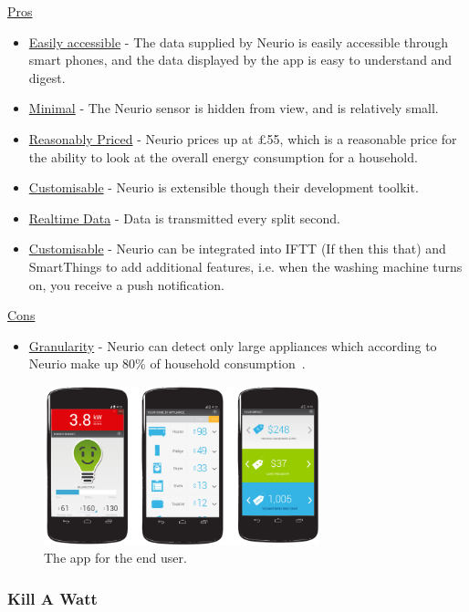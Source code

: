 \documentclass[preprint,12pt,3p]{elsarticle}
\begin{document}
\begin{center}
\underline{Pros}
\begin{itemize}
        \item \underline{Easily accessible} - The data supplied by Neurio is easily accessible through smart phones, and the data displayed by the app is easy to understand and digest.
    \item \underline{Minimal} - The Neurio sensor is hidden from view, and is relatively small.
    \item \underline{Reasonably Priced} - Neurio prices up at \pounds55, which is a reasonable price for the ability to look at the overall energy consumption for a household. 
    \item \underline{Customisable} - Neurio is extensible though their development toolkit.
    \item \underline{Realtime Data} - Data is transmitted every split second.
    \item \underline{Customisable} - Neurio can be integrated into IFTT (If then this that) and SmartThings to add additional features, i.e. when the washing machine turns on, you receive a push notification.
\end{itemize}
    
\underline{Cons}
\begin{itemize}
    \item \underline{Granularity} - Neurio can detect only large appliances which according to Neurio make up 80\% of household consumption~\cite{neurioaccuracy}.

\end{itemize}
    
\end{center}

\begin{figure}[H]
    \centering
    \includegraphics[width=8cm]{existing/neurio-app}
    \caption {The app for the end user.}
\end{figure}


\subsubsection{Kill A Watt}
\end{document}
